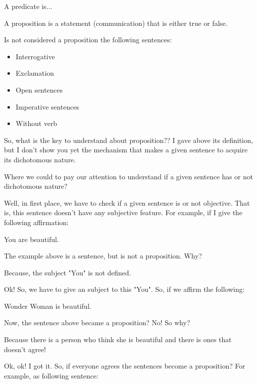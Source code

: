 \begin{definition}[Predicate]
    A predicate is...
\end{definition}

\begin{definition}[Proposition]
A proposition is a statement (communication) that is either true or false. \cite{ericlehman}
\end{definition}

Is not considered a proposition the following sentences:

\begin{itemize}
    \item Interrogative
    \item Exclamation
    \item Open sentences
    \item Imperative sentences
    \item Without verb
\end{itemize}

So, what is the key to understand about proposition?? I gave above its definition, but I don't show you yet the mechanism that makes a given sentence to acquire its dichotomous nature.

Where we could to pay our attention to understand if a given sentence has or not dichotomous nature?

Well, in first place, we have to check if a given sentence is or not objective. That is, this sentence doesn't have any subjective feature. For example, if I give the following affirmation:

\begin{example}\label{exemplo1}
    You are beautiful.
\end{example}

The example above is a sentence, but is not a proposition. Why?

Because, the subject "You" is not defined.

Ok! So, we have to give an subject to this "You". So, if we affirm the following:

\begin{example}
    Wonder Woman is beautiful.
\end{example}

Now, the sentence above became a proposition? No! So why?

Because there is a person who think she is beautiful and there is ones that doesn't agree!

Ok, ok! I got it. So, if everyone agrees the sentences become a proposition? For example, as following sentence:

